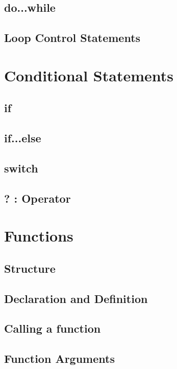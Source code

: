 \documentclass[10pt,a4paper]{scrartcl}
\begin{document}
\begin{multicols*}{2}
\subsection{do...while}

\subsection{Loop Control Statements}

\section{Conditional Statements}

\subsection{if}

\subsection{if...else}

\subsection{switch}

\subsection{? : Operator}

\section{Functions}

\subsection{Structure}

\subsection{Declaration and Definition}

\subsection{Calling a function}

\subsection{Function Arguments}


\end{multicols*}
\end{document}
